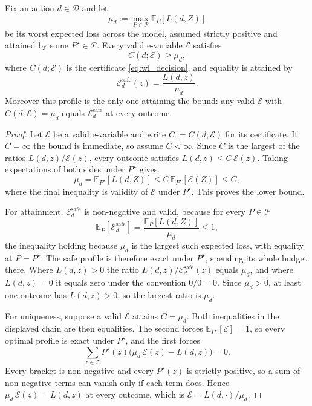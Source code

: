 \begin{theorem}\label{thm:cert}
Fix an action $d\in\mathcal D$ and let
\[
  \mu_d:=\max_{P\in\mathcal P}\mathbb E_{P}[L(d,Z)]
\]
be its worst expected loss across the model, assumed strictly positive and
attained by some $P^\star\in\mathcal P$. Every valid e-variable
$\mathcal E$ satisfies
\[
  C(d;\mathcal E)\geq\mu_d,
\]
where $C(d;\mathcal E)$ is the certificate \eqref{eq:wl_decision},
and equality is attained by
\[
 \mathcal E_d^{\mathrm{safe}}(z)=\frac{L(d,z)}{\mu_d}.
\]
Moreover this profile is the only one attaining the bound: any valid
$\mathcal E$ with $C(d;\mathcal E)=\mu_d$ equals $\mathcal E_d^{\mathrm{safe}}$
at every outcome.
\end{theorem}

\begin{proof}
Let $\mathcal E$ be a valid e-variable and write $C:=C(d;\mathcal E)$ for
its certificate. If $C=\infty$ the bound is immediate, so assume $C<\infty$.
Since $C$ is the largest of the ratios $L(d,z)/\mathcal E(z)$, every outcome
satisfies $L(d,z)\leq C\,\mathcal E(z)$. Taking expectations of both sides
under $P^\star$ gives
\[
  \mu_d=\mathbb E_{P^\star}[L(d,Z)]
  \leq C\,\mathbb E_{P^\star}[\mathcal E(Z)]
  \leq C,
\]
where the final inequality is validity of $\mathcal E$ under $P^\star$. This
proves the lower bound.

For attainment, $\mathcal E_d^{\mathrm{safe}}$ is non-negative and valid,
because for every $P\in\mathcal P$
\[
  \mathbb E_{P}[\mathcal E_d^{\mathrm{safe}}]
  =\frac{\mathbb E_{P}[L(d,Z)]}{\mu_d}\leq1,
\]
the inequality holding because $\mu_d$ is the largest such expected loss,
with equality at $P=P^\star$. The safe profile is therefore exact under
$P^\star$, spending its whole budget there. Where
$L(d,z)>0$ the ratio $L(d,z)/\mathcal E_d^{\mathrm{safe}}(z)$ equals $\mu_d$,
and where $L(d,z)=0$ it equals zero under the convention $0/0=0$. Since
$\mu_d>0$, at least one outcome has $L(d,z)>0$, so the largest ratio is
$\mu_d$.

For uniqueness, suppose a valid $\mathcal E$ attains $C=\mu_d$. Both
inequalities in the displayed chain are then equalities. The second forces
$\mathbb E_{P^\star}[\mathcal E]=1$, so every optimal profile is exact under
$P^\star$, and the first forces
\[
  \sum_{z\in\mathcal Z}P^\star(z)\bigl(\mu_d\,\mathcal E(z)-L(d,z)\bigr)=0 .
\]
Every bracket is non-negative and every $P^\star(z)$ is strictly positive, so a
sum of non-negative terms can vanish only if each term does. Hence
$\mu_d\,\mathcal E(z)=L(d,z)$ at every outcome, which is
$\mathcal E=L(d,\cdot)/\mu_d$.
\end{proof}

